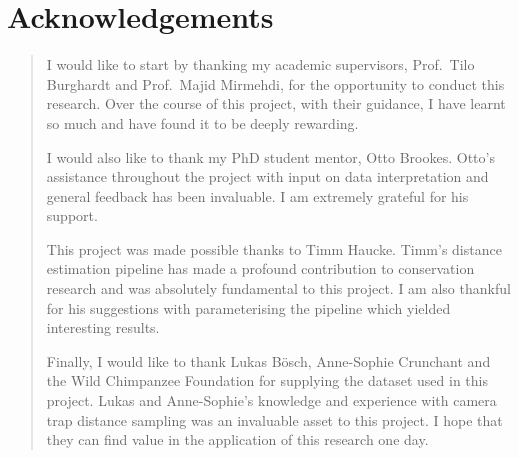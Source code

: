\part*{Acknowledgements}

\begin{quote}

    I would like to start by thanking my academic supervisors, Prof.\ Tilo Burghardt and
    Prof.\ Majid Mirmehdi, for the opportunity to conduct this research.
    Over the course of this project, with their guidance, I have learnt so much and have
    found it to be deeply rewarding.

    I would also like to thank my PhD student mentor, Otto Brookes.
    Otto's assistance throughout the project with input on data interpretation and
    general feedback has been invaluable.
    I am extremely grateful for his support.

    This project was made possible thanks to Timm Haucke.
    Timm's distance estimation pipeline has made a profound contribution to conservation
    research and was absolutely fundamental to this project.
    I am also thankful for his suggestions with parameterising the pipeline which
    yielded interesting results.

    Finally, I would like to thank Lukas Bösch, Anne-Sophie Crunchant and the Wild Chimpanzee
    Foundation for supplying the dataset used in this project.
    Lukas and Anne-Sophie's knowledge and experience with camera trap distance sampling was an
    invaluable asset to this project.
    I hope that they can find value in the application of this research one day.

\end{quote}
